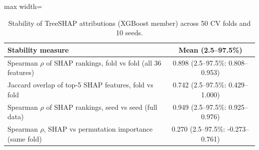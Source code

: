 \begin{table}[!t]
\centering
\scriptsize
\caption{Stability of TreeSHAP attributions (XGBoost member) across 50 CV folds and 10 seeds.}
\label{tab:e8}
\setlength{\tabcolsep}{3pt}
\begin{adjustbox}{max width=\linewidth}
\begin{tabular}{lc}
\toprule
Stability measure & Mean (2.5--97.5\%) \\
\midrule
Spearman $\rho$ of SHAP rankings, fold vs fold (all 36 features) & 0.898 (2.5--97.5\%: 0.808--0.953) \\
Jaccard overlap of top-5 SHAP features, fold vs fold & 0.742 (2.5--97.5\%: 0.429--1.000) \\
Spearman $\rho$ of SHAP rankings, seed vs seed (full data) & 0.949 (2.5--97.5\%: 0.925--0.976) \\
Spearman $\rho$, SHAP vs permutation importance (same fold) & 0.270 (2.5--97.5\%: -0.273--0.761) \\
\bottomrule
\end{tabular}
\end{adjustbox}
\end{table}
